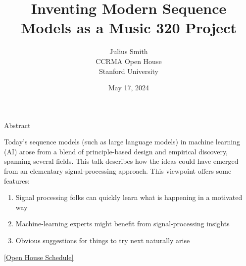 
\newcommand{\theTitle}{Inventing Modern Sequence Models as a Music 320 Project}
\newcommand{\theSubTitle}{Samples become Meaning Vectors}
\newcommand{\theEvent}{CCRMA Open House} 
\newcommand{\theDate}{May 17, 2024}

\newcommand{\theAuthor}{Julius Smith}


\usepackage{xcolor}

\usepackage{etoolbox} %
\newtoggle{local}
\togglefalse{local}


\date{\theDate}

\title{\theTitle}
\author{\theAuthor\\
  CCRMA Open House\\
  Stanford University \\[10pt]
}



\maketitle


%

\begin{slide}[\slideopts,toc={}]{Abstract}

Today's sequence models (such as large language models) in machine
learning (AI) arose from a blend of principle-based design and
empirical discovery, spanning several fields. This talk describes how
the ideas could have emerged from an elementary signal-processing
approach. This viewpoint offers some features:
\begin{enumerate}
\item Signal processing folks can quickly learn what is happening in a motivated way
\item Machine-learning experts might benefit from signal-processing insights
\item Obvious suggestions for things to try next naturally arise
\end{enumerate}

\href{https://ccrma.stanford.edu/ccrma-open-house}{[Open House Schedule]}

\end{slide}

